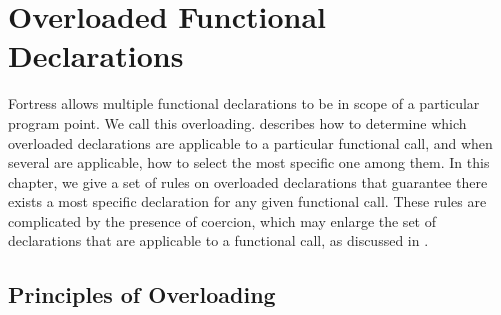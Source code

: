 %
%
%
%

\chapter{Overloaded Functional Declarations}



Fortress allows multiple functional declarations to be in scope of a
particular program point.  We call this overloading.
 describes
how to determine which overloaded declarations are
applicable to a particular functional call, and when several
are applicable, how to select the most specific one among them.
In this chapter, we give a
set of rules on overloaded declarations that guarantee there
exists a most specific declaration for any given functional call.
These rules are complicated by the presence of coercion, which may
enlarge the set of declarations that are applicable to a functional
call, as discussed in .



\section{Principles of Overloading}

